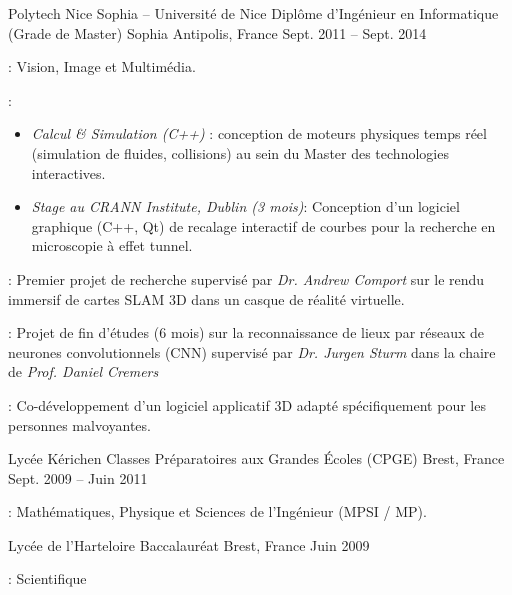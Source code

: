 \begin{cventries}
  \cventry
    {Polytech Nice Sophia -- Université de Nice} %
    {Diplôme d'Ingénieur en Informatique (Grade de Master)} %
    {Sophia Antipolis, France} %
    {Sept. 2011 -- Sept. 2014} %
    {
      \begin{cvitems} %
        \item {} : Vision, Image et Multimédia.
        \item {} :
          \begin{itemize}
            \item \emph{Calcul \& Simulation (C++)} : conception de moteurs physiques temps réel (simulation de fluides, collisions) au sein du Master des technologies interactives.
            \item \emph{Stage au CRANN Institute, Dublin (3 mois)}: Conception d'un logiciel graphique (C++, Qt) de recalage interactif de courbes pour la recherche en microscopie à effet tunnel.
          \end{itemize}
        \item {} : Premier projet de recherche supervisé par \emph{Dr. Andrew Comport} sur le rendu immersif de cartes SLAM 3D dans un casque de réalité virtuelle.
        \item {} : Projet de fin d'études (6 mois) sur la reconnaissance de lieux par réseaux de neurones convolutionnels (CNN) supervisé par \emph{Dr. Jurgen Sturm} dans la chaire de \emph{Prof. Daniel Cremers}
        \item {} : Co-développement d'un logiciel applicatif 3D adapté spécifiquement pour les personnes malvoyantes.
      \end{cvitems}
    }

  \cventry
    {Lycée Kérichen} %
    {Classes Préparatoires aux Grandes Écoles (CPGE)} %
    {Brest, France} %
    {Sept. 2009 -- Juin 2011} %
    {
      \begin{cvitems} %
        \item {} : Mathématiques, Physique et Sciences de l'Ingénieur (MPSI / MP).
      \end{cvitems}
    }

  \cventry
    {Lycée de l'Harteloire} %
    {Baccalauréat} %
    {Brest, France} %
    {Juin 2009} %
    {
      \begin{cvitems} %
        \item {} : Scientifique
      \end{cvitems}
    }
\end{cventries}

